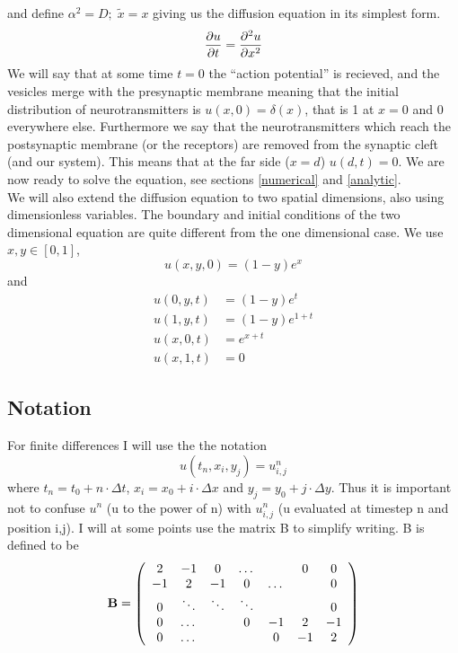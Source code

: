 \documentclass[a4paper,english, 10pt, twoside]{article}
\renewcommand{\d}{\partial}
\begin{document}
and define $\alpha^2 = D; \; \tilde{x} = x$ giving us the diffusion equation in its simplest form.
\begin{equation*}
 {\d u \over \d t} = {\d^2 u \over \d x^2}
\end{equation*}
We will say that at some time $t = 0$ the ``action potential'' is recieved, and the vesicles merge with the presynaptic membrane meaning that the 
initial distribution of neurotransmitters is $u(x,0) = \delta(x)$, that is 1 at $x = 0$ and 0 everywhere else. Furthermore we say that the 
neurotransmitters which reach the postsynaptic membrane (or the receptors) are removed from the synaptic cleft (and our system). This means that at 
the far side ($x=d$) $u(d,t) = 0$. We are now ready to solve the equation, see sections \ref{numerical} and \ref{analytic}.\\
We will also extend the diffusion equation to two spatial dimensions, also using dimensionless variables. The boundary and initial conditions of 
the two dimensional equation are quite different from the one dimensional case. We use $x,y\in[0,1]$,
$$
u(x,y,0) = (1-y)e^{x}
$$
and
\begin{align*}
 u(0,y,t) &= (1-y)e^{t} \\
 u(1,y,t) &= (1-y)e^{1+t} \\
 u(x,0,t) &= e^{x+t} \\
 u(x,1,t) &= 0
\end{align*}

\subsection{Notation}
For finite differences I will use the the notation 
\begin{equation*}
 u(t_n,x_i,y_j) = u^n_{i,j}
\end{equation*}
where $t_n = t_0 + n\cdot\Delta t$, $x_i = x_0 +i\cdot\Delta x$ and $y_j = y_0 +j\cdot\Delta y$. Thus it is important not to 
confuse $u^n$ (u to the power of n) with $u^n_{i,j}$ (u evaluated at timestep n and position i,j). I will at some points use the 
matrix B to simplify writing. B is defined to be
\begin{align*}
 \mathbf{B} = \left(\begin{array}{c c c c c c c}
        2 & -1 &0 &\dots & &0 &0 \\
        -1 & 2 & -1 &0 &\dots & &0 \\
        0& \ddots & \ddots & \ddots &  &  &0\\
        0& \dots &  &0&-1 & 2 & -1\\
         0& \dots & & &0&-1 & 2 
       \end{array}\right)
\end{align*}
\end{document}
